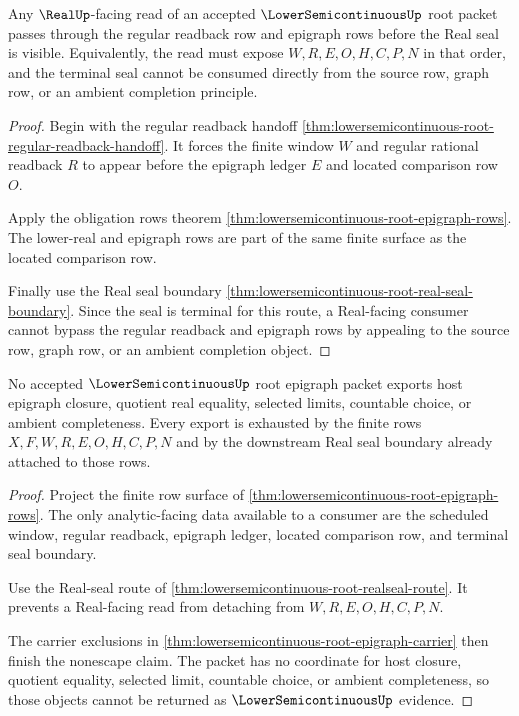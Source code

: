 \begin{theorem}
\label{thm:lowersemicontinuous-root-realseal-route}
Any $\RealUp$-facing read of an accepted $\LowerSemicontinuousUp$ root packet passes through the regular readback row and epigraph rows before the Real seal is visible. Equivalently, the read must expose $W,R,E,O,H,C,P,N$ in that order, and the terminal seal cannot be consumed directly from the source row, graph row, or an ambient completion principle.
\end{theorem}
\begin{proof}
Begin with the regular readback handoff \autoref{thm:lowersemicontinuous-root-regular-readback-handoff}. It forces the finite window $W$ and regular rational readback $R$ to appear before the epigraph ledger $E$ and located comparison row $O$.

Apply the obligation rows theorem \autoref{thm:lowersemicontinuous-root-epigraph-rows}. The lower-real and epigraph rows are part of the same finite surface as the located comparison row.

Finally use the Real seal boundary \autoref{thm:lowersemicontinuous-root-real-seal-boundary}. Since the seal is terminal for this route, a Real-facing consumer cannot bypass the regular readback and epigraph rows by appealing to the source row, graph row, or an ambient completion object.
\end{proof}

\begin{theorem}
\label{thm:lowersemicontinuous-root-epigraph-nonescape}
No accepted $\LowerSemicontinuousUp$ root epigraph packet exports host epigraph closure, quotient real equality, selected limits, countable choice, or ambient completeness. Every export is exhausted by the finite rows $X,F,W,R,E,O,H,C,P,N$ and by the downstream Real seal boundary already attached to those rows.
\end{theorem}
\begin{proof}
Project the finite row surface of \autoref{thm:lowersemicontinuous-root-epigraph-rows}. The only analytic-facing data available to a consumer are the scheduled window, regular readback, epigraph ledger, located comparison row, and terminal seal boundary.

Use the Real-seal route of \autoref{thm:lowersemicontinuous-root-realseal-route}. It prevents a Real-facing read from detaching from $W,R,E,O,H,C,P,N$.

The carrier exclusions in \autoref{thm:lowersemicontinuous-root-epigraph-carrier} then finish the nonescape claim. The packet has no coordinate for host closure, quotient equality, selected limit, countable choice, or ambient completeness, so those objects cannot be returned as $\LowerSemicontinuousUp$ evidence.
\end{proof}

